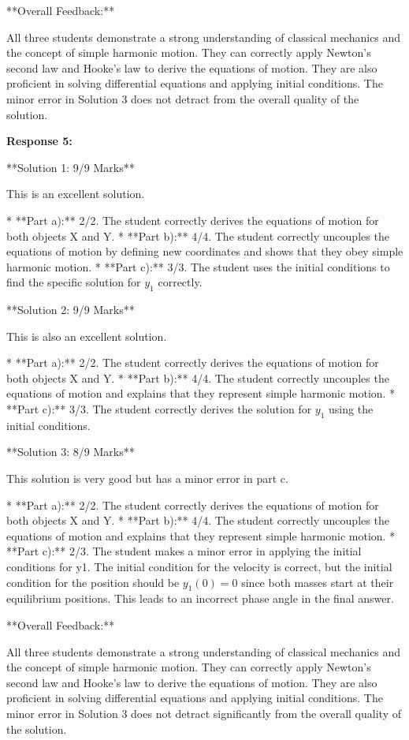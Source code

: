 \documentclass[a4paper,11pt]{article}
\begin{document}
**Overall Feedback:**

All three students demonstrate a strong understanding of classical mechanics and the concept of simple harmonic motion. They can correctly apply Newton's second law and Hooke's law to derive the equations of motion. They are also proficient in solving differential equations and applying initial conditions. The minor error in Solution 3 does not detract from the overall quality of the solution.

\textbf{Response 5:}

**Solution 1: 9/9 Marks**

This is an excellent solution. 

*   **Part a):** 2/2. The student correctly derives the equations of motion for both objects X and Y.
*   **Part b):** 4/4. The student correctly uncouples the equations of motion by defining new coordinates and shows that they obey simple harmonic motion.
*   **Part c):** 3/3. The student uses the initial conditions to find the specific solution for \(y_1\) correctly.

**Solution 2: 9/9 Marks**

This is also an excellent solution.

*   **Part a):** 2/2. The student correctly derives the equations of motion for both objects X and Y.
*   **Part b):** 4/4. The student correctly uncouples the equations of motion and explains that they represent simple harmonic motion.
*   **Part c):** 3/3. The student correctly derives the solution for \(y_1\) using the initial conditions.

**Solution 3: 8/9 Marks**

This solution is very good but has a minor error in part c.

*   **Part a):** 2/2. The student correctly derives the equations of motion for both objects X and Y.
*   **Part b):** 4/4. The student correctly uncouples the equations of motion and explains that they represent simple harmonic motion.
*   **Part c):** 2/3. The student makes a minor error in applying the initial conditions for y1. The initial condition for the velocity is correct, but the initial condition for the position should be \( y_1(0) = 0 \) since both masses start at their equilibrium positions. This leads to an incorrect phase angle in the final answer. 

**Overall Feedback:**

All three students demonstrate a strong understanding of classical mechanics and the concept of simple harmonic motion. They can correctly apply Newton's second law and Hooke's law to derive the equations of motion. They are also proficient in solving differential equations and applying initial conditions. The minor error in Solution 3 does not detract significantly from the overall quality of the solution.
\end{document}

